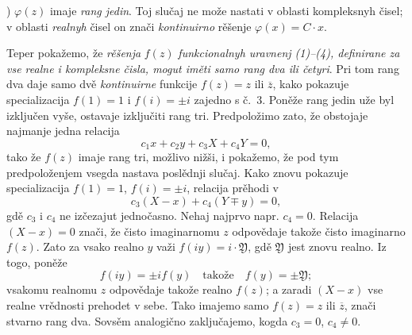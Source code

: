 \documentclass[11pt]{article}
\providecommand{\Yreal}{\mathfrak Y}
\begin{document}
) \(\varphi(z)\) imaje {\itshape rang jedin}. Toj slučaj ne može nastati v oblasti kompleksnyh čisel; v oblasti {\itshape realnyh} čisel on znači {\itshape kontinuirno} rěšenje \(\varphi(x)=C\cdot x\).

Teper pokažemo, že {\itshape rěšenja} \(f(z)\) {\itshape funkcionalnyh uravnenj (1)--(4), definirane za vse realne i kompleksne čisla, mogut iměti samo rang dva ili četyri}. Pri tom rang dva daje samo dvě {\itshape kontinuirne} funkcije \(f(z)=z\) ili \(\overline z\), kako pokazuje specializacija \(f(1)=1\) i \(f(i)=\pm i\) zajedno s č.~3. Poněže rang jedin uže byl izključen vyše, ostavaje izključiti rang tri. Predpoložimo zato, že obstojaje najmanje jedna relacija
\[
c_1x+c_2y+c_3X+c_4Y=0,
\]
tako že \(f(z)\) imaje rang tri, možlivo nižši, i pokažemo, že pod tym predpoloženjem vsegda nastava poslědnji slučaj. Kako znovu pokazuje specializacija \(f(1)=1\), \(f(i)=\pm i\), relacija prěhodi v
\[
c_3(X-x)+c_4(Y\mp y)=0,
\]
gdě \(c_3\) i \(c_4\) ne izčezajut jednočasno. Nehaj najprvo napr. \(c_4=0\). Relacija \((X-x)=0\) znači, že čisto imaginarnomu \(z\) odpovědaje takože čisto imaginarno \(f(z)\). Zato za vsako realno \(y\) važi \(f(iy)=i\cdot\Yreal\), gdě \(\Yreal\) jest znovu realno. Iz togo, poněže
\[
f(iy)=\pm i f(y)\quad\text{takože}\quad f(y)=\pm\Yreal;
\]
vsakomu realnomu \(z\) odpovědaje takože realno \(f(z)\); a zaradi \((X-x)\) vse realne vrědnosti prehodet v sebe. Tako imajemo samo \(f(z)=z\) ili \(\overline z\), znači stvarno rang dva. Sovsěm analogično zaključajemo, kogda \(c_3=0\), \(c_4\ne0\).
\end{document}
